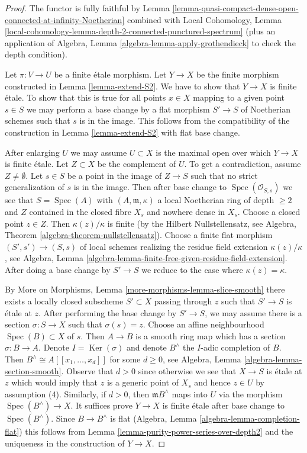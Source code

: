 \documentclass{stacks-project}
\theoremstyle{plain}
\theoremstyle{definition}
\theoremstyle{remark}
\numberwithin{equation}{subsection}
\def\Spec{\mathop{\mathrm{Spec}}}
\def\Ker{\mathop{\mathrm{Ker}}}
\begin{document}
\begin{proof}
The functor is fully faithful by
Lemma \ref{lemma-quasi-compact-dense-open-connected-at-infinity-Noetherian}
combined with Local Cohomology,
Lemma \ref{local-cohomology-lemma-depth-2-connected-punctured-spectrum}
(plus an application of
Algebra, Lemma \ref{algebra-lemma-apply-grothendieck}
to check the depth condition).

\medskip\noindent
Let $\pi : V \to U$ be a finite \'etale morphism. Let $Y \to X$
be the finite morphism constructed in Lemma \ref{lemma-extend-S2}.
We have to show that $Y \to X$ is finite \'etale.
To show that this is true for all points $x \in X$ mapping to a
given point $s \in S$ we may perform a base change by a flat
morphism $S' \to S$ of Noetherian schemes such that $s$ is
in the image. This follows from the compatibility of the
construction in Lemma \ref{lemma-extend-S2} with flat base change.

\medskip\noindent
After enlarging $U$ we may assume $U \subset X$ is
the maximal open over which $Y \to X$ is finite \'etale.
Let $Z \subset X$ be the complement of $U$.
To get a contradiction, assume $Z \not = \emptyset$.
Let $s \in S$ be a point in the image of $Z \to S$
such that no strict generalization of $s$ is in the image.
Then after base change to $\Spec(\mathcal{O}_{S, s})$
we see that $S = \Spec(A)$ with $(A, \mathfrak m, \kappa)$
a local Noetherian ring of depth $\geq 2$ and $Z$
contained in the closed fibre $X_s$
and nowhere dense in $X_s$. Choose a closed point $z \in Z$.
Then $\kappa(z)/\kappa$ is finite (by the Hilbert Nullstellensatz, see
Algebra, Theorem \ref{algebra-theorem-nullstellensatz}).
Choose a finite flat morphism $(S', s') \to (S, s)$ of local schemes
realizing the residue field extension $\kappa(z)/\kappa$, see
Algebra, Lemma \ref{algebra-lemma-finite-free-given-residue-field-extension}.
After doing a base change by $S' \to S$ we reduce to the case
where $\kappa(z) = \kappa$.

\medskip\noindent
By More on Morphisms, Lemma \ref{more-morphisms-lemma-slice-smooth}
there exists a locally closed subscheme $S' \subset X$ passing through $z$
such that $S' \to S$ is \'etale at $z$. After performing the base change
by $S' \to S$, we may assume there is a section $\sigma : S \to X$
such that $\sigma(s) = z$. Choose an affine neighbourhood
$\Spec(B) \subset X$ of $s$. Then $A \to B$ is a smooth ring
map which has a section $\sigma : B \to A$. Denote $I = \Ker(\sigma)$
and denote $B^\wedge$ the $I$-adic completion of $B$.
Then $B^\wedge \cong A[[x_1, \ldots, x_d]]$ for some $d \geq 0$, see
Algebra, Lemma \ref{algebra-lemma-section-smooth}.
Observe that $d > 0$ since otherwise we see that $X \to S$
is \'etale at $z$ which would imply that $z$ is a generic point of
$X_s$ and hence $z \in U$ by assumption (4).
Similarly, if $d > 0$, then $\mathfrak m B^\wedge$ maps into
$U$ via the morphism $\Spec(B^\wedge) \to X$.
It suffices prove $Y \to X$ is finite \'etale after base change
to $\Spec(B^\wedge)$. Since $B \to B^\wedge$ is flat
(Algebra, Lemma \ref{algebra-lemma-completion-flat})
this follows from Lemma \ref{lemma-purity-power-series-over-depth2}
and the uniqueness in the construction of $Y \to X$.
\end{proof}
\end{document}
